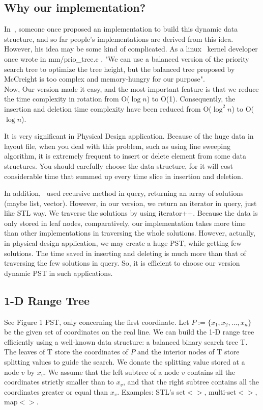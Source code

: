 \documentclass{acm_proc_article-sp}
\begin{document}
\subsection{Why our implementation?}

In~\cite{Edward_04}, someone once proposed an implementation to build this dynamic data structure, and so far people's implementations are derived from this
idea. However, his idea may be some kind of complicated. As a linux \
kernel developer once wrote in mm/prio\_tree.c , "We can use a
balanced version of the priority search tree to optimize the tree
height, but the balanced tree proposed by McCreight is too complex
and memory-hungry for our purpose".\\
Now, Our version made it easy, and the most important feature is that we reduce the time complexity
in rotation from O($\log n$) to O(1). Consequently, the
insertion and deletion time complexity have been reduced from
O($\log^2 n$) to O($\log n$).

It is very significant in Physical Design application. Because of the
huge data in layout file, when you deal with this problem, such as
using line sweeping algorithm, it is extremely frequent to insert or
delete element from some data structures. You should carefully
choose the data structure, for it will cost considerable time that summed
up every time slice in insertion and deletion.

In addition,~\cite{Edward_04} used recursive method in query, returning an
array of solutions (maybe list, vector). However, in our version, we
return an iterator in query, just like STL way. We traverse the
solutions by using iterator++. Because the data is only stored in
leaf nodes, comparatively, our implementation takes more time than
other implementations in traversing the whole solutions. However,
actually, in physical design application, we may create a huge PST,
while getting few solutions. The time saved in inserting and
deleting is much more than that of traversing the few solutions in
query. So, it is efficient to choose our version dynamic PST in such
applications.


\subsection{1-D Range Tree~\cite{CG_02}}
See Figure 1 PST, only concerning the first coordinate. Let
$P:=\{x_1,x_2,\ldots,x_n\}$ be the given set of coordinates on the
real line. We can build the 1-D range tree efficiently using a
well-known data structure: a balanced binary search tree T. The
leaves of T store the coordinates of $P$ and the interior nodes of T
store splitting values to guide the search. We donate the splitting
value stored at a node $v$ by $x_v$. We assume that the left subtree
of a node $v$ contains all the coordinates strictly smaller than to
$x_v$, and that the right subtree contains all the coordinates
greater or equal than $x_v$. Examples: STL's set$<>$,
multi-set$<>$, map$<>$.
\end{document}
